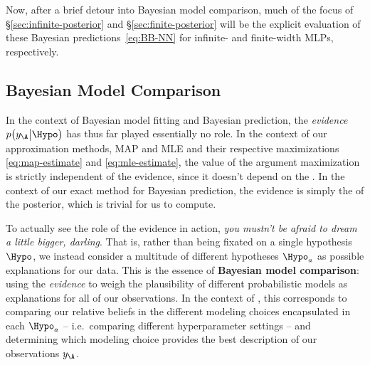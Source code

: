Now, after a brief detour into Bayesian model comparison, much of the focus of \S\ref{sec:infinite-posterior} and \S\ref{sec:finite-posterior} will be the explicit evaluation of these Bayesian predictions~\eqref{eq:BB-NN} for infinite- and finite-width MLPs, respectively.























\subsection{Bayesian Model Comparison}\label{subsec:bayesian-model-comparison}
In the context of Bayesian model fitting and Bayesian prediction, the \emph{evidence} $p\big(y_{\A}\big\vert  \Hypo\big)$ has thus far played essentially no role. In the context of our approximation methods, MAP and MLE and their respective maximizations \eqref{eq:map-estimate} and \eqref{eq:mle-estimate}, the value of the argument maximization is strictly independent of the evidence, since it doesn't depend on the . In the context of our exact method for Bayesian prediction, the evidence is simply the  of the posterior, which is trivial for us to compute.

To actually see the role of the evidence in action, %
\emph{you mustn't be afraid to dream a little bigger, darling}.
That is, rather than being fixated on a single hypothesis $\Hypo$, we instead consider a multitude of different hypotheses $\Hypo_{a}$ as possible explanations for our data. This is the essence of \textbf{Bayesian model comparison}: using the \emph{evidence} to weigh the plausibility of different probabilistic models as explanations for all of our observations. In the context of , this corresponds to comparing our relative beliefs in the different modeling choices encapsulated in each $\Hypo_{a}$ -- i.e.~comparing different hyperparameter settings -- and determining which modeling choice provides the best description of our observations $y_\A$.


